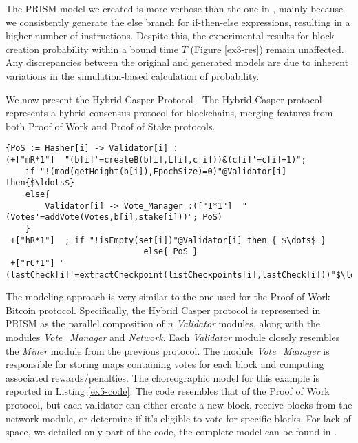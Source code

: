 The PRISM model we created is more verbose than the one in \cite{DBLP:journals/concurrency/BistarelliNGLMV23}, mainly because we consistently generate the else branch for if-then-else expressions, resulting in a higher number of instructions. Despite this, the experimental results for block creation probability within a bound time $T$ (Figure \ref{ex3-res}) remain unaffected. Any discrepancies between the original and generated models are due to inherent variations in the simulation-based calculation of probability.


\begin{comment}
\begin{wrapfigure}[12]{l}{4.5cm}
	\texttt{[image: ethereum.pdf]}	
\end{wrapfigure} 
\end{comment}
We now present the Hybrid Casper Protocol \cite{DBLP:journals/distribledger/GallettaLMV23}. The Hybrid Casper protocol represents a hybrid consensus protocol for blockchains, merging features from both Proof of Work and Proof of Stake protocols. 
\begin{lstlisting}[style=chor-color,tabsize=2,breaklines=true, postbreak=\mbox{\textcolor{red}{$\hookrightarrow$}\space},	caption={Excerpt of the Hybrid Casper Protocol as a choreography},captionpos=b,label={ex5-code}]
{PoS := Hasher[i] -> Validator[i] :
(+["mR*1"]  "(b[i]'=createB(b[i],L[i],c[i]))&(c[i]'=c[i]+1)"; 
	if "!(mod(getHeight(b[i]),EpochSize)=0)"@Validator[i] then{$\ldots$}
	else{
		Validator[i] -> Vote_Manager :(["1*1"]  "(Votes'=addVote(Votes,b[i],stake[i]))"; PoS)
	}
 +["hR*1"]  ; if "!isEmpty(set[i])"@Validator[i] then { $\dots$ }
 							else{ PoS }
 +["rC*1"] "(lastCheck[i]'=extractCheckpoint(listCheckpoints[i],lastCheck[i]))"$\ldots$}

\end{lstlisting}
The modeling approach is very similar to the one used for the Proof of Work Bitcoin protocol. Specifically, the Hybrid Casper protocol is represented in PRISM as the parallel composition of $n$ \emph{Validator} modules, along with the modules \emph{Vote\_Manager} and \emph{Network}. Each \emph{Validator} module closely resembles the \emph{Miner} module from the previous protocol. The module \emph{Vote\_Manager} is responsible for storing maps containing votes for each block and computing associated rewards/penalties.
The choreographic model for this example is reported in Listing \ref{ex5-code}. 
The code resembles that of the Proof of Work protocol, but each validator can either create a new block, receive blocks from the network module, or determine if it's eligible to vote for specific blocks.
For lack of space, we detailed only part of the code, the complete model can be found in \cite{repository}.


